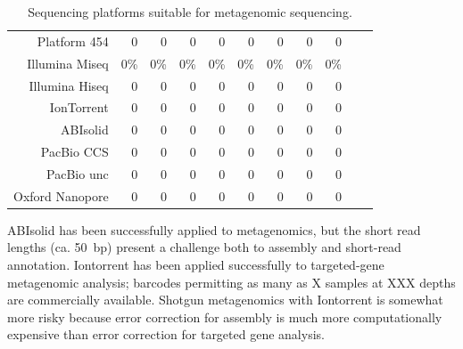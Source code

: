 \documentclass[graybox]{svmult}
\begin{document}
\begin{table}
\caption{Sequencing platforms suitable for metagenomic sequencing.}
\begin{tabular}{rrrrrrrrrrr}
Platform
454  & 0 & 0 & 0 & 0 & 0 & 0 & 0 & 0  \\
Illumina Miseq & 0\% & 0\% & 0\% & 0\% & 0\% & 0\% & 0\% & 0\%  \\
Illumina Hiseq & 0 & 0 & 0 & 0 & 0 & 0 & 0 & 0  \\
IonTorrent & 0 & 0 & 0 & 0 & 0 & 0 & 0 & 0  \\
ABIsolid & 0 & 0 & 0 & 0 & 0 & 0 & 0 & 0  \\
PacBio CCS& 0 & 0 & 0 & 0 & 0 & 0 & 0 & 0  \\
PacBio unc& 0 & 0 & 0 & 0 & 0 & 0 & 0 & 0  \\
Oxford Nanopore  & 0 & 0 & 0 & 0 & 0 & 0 & 0 & 0  \\
\end{tabular}
\end{table}


ABIsolid has been successfully applied to metagenomics, but the short read lengths (ca. 50~bp) present a challenge both to assembly and short-read annotation.
Iontorrent has been applied successfully to targeted-gene metagenomic analysis; barcodes permitting as many as X samples at XXX depths are commercially available.  Shotgun metagenomics with Iontorrent is somewhat more risky because error correction for assembly is much more computationally expensive than error correction for targeted gene analysis.  
\end{document}
